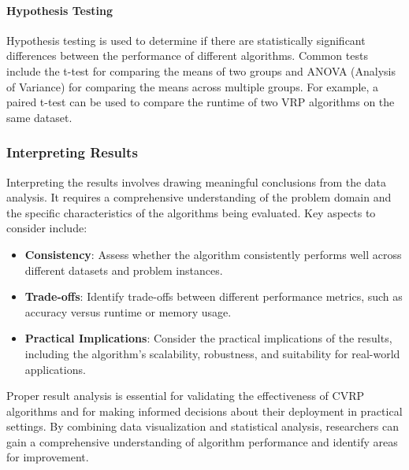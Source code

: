 \documentclass{article}
\begin{document}
    \paragraph{Hypothesis Testing}

    Hypothesis testing is used to determine if there are statistically significant differences between the performance of different algorithms. Common tests include the t-test for comparing the means of two groups and ANOVA (Analysis of Variance) for comparing the means across multiple groups. For example, a paired t-test can be used to compare the runtime of two VRP algorithms on the same dataset. \cite{Halim2021}

    \subsubsection{Interpreting Results}

    Interpreting the results involves drawing meaningful conclusions from the data analysis. It requires a comprehensive understanding of the problem domain and the specific characteristics of the algorithms being evaluated. Key aspects to consider include:

    \begin{itemize}
        \item \textbf{Consistency}: Assess whether the algorithm consistently performs well across different datasets and problem instances.
        \item \textbf{Trade-offs}: Identify trade-offs between different performance metrics, such as accuracy versus runtime or memory usage.
        \item \textbf{Practical Implications}: Consider the practical implications of the results, including the algorithm's scalability, robustness, and suitability for real-world applications. \cite{Halim2021}
    \end{itemize}

    Proper result analysis is essential for validating the effectiveness of CVRP algorithms and for making informed decisions about their deployment in practical settings. By combining data visualization and statistical analysis, researchers can gain a comprehensive understanding of algorithm performance and identify areas for improvement. \cite{staegemann2024}
\end{document}
